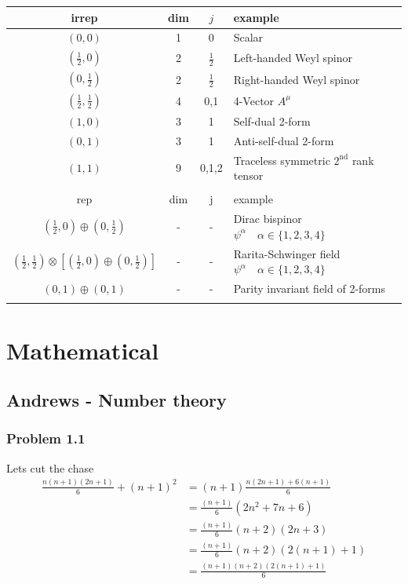 \documentclass[10pt,a4paper]{article}
\theoremstyle{definition}
\begin{document}
\begin{center}
 \begin{tabular}{c c c l} 
 \hline
 irrep & dim & $j$ & example \\ [0.5ex] 
 \hline\hline
 $(0,0)$                        & 1 & 0 & Scalar \\  [0.5ex]
 $(\frac{1}{2},0)$              & 2 & $\frac{1}{2}$ & Left-handed Weyl spinor \\  [0.5ex]
 $(0,\frac{1}{2})$              & 2 & $\frac{1}{2}$ & Right-handed Weyl spinor \\  [0.5ex]
 $(\frac{1}{2},\frac{1}{2})$    & 4 & 0,1 & 4-Vector $A^\mu$ \\  [0.5ex]
 $(1,0)$                        & 3 & 1 & Self-dual 2-form \\  [0.5ex]
 $(0,1)$                        & 3 & 1 & Anti-self-dual 2-form \\  [0.5ex]
 $(1,1)$                        & 9 & 0,1,2 & Traceless symmetric $2^\text{nd}$ rank tensor \\ \hline  \\ [0.5ex]
  \hline
 rep & dim & j & example \\ [0.5ex] 
 \hline\hline
 $(\frac{1}{2},0)\oplus(0,\frac{1}{2})$& - & - & Dirac bispinor $\psi^\alpha\quad \alpha\in\{1,2,3,4\}$ \\  [0.5ex]
 $(\frac{1}{2},\frac{1}{2})\otimes\left[(\frac{1}{2},0)\oplus(0,\frac{1}{2})\right]$& - & - & Rarita-Schwinger field $\psi^\alpha\quad \alpha\in\{1,2,3,4\}$ \\  [0.5ex]
  $(0,1)\oplus(0,1)$& - & - & Parity invariant field of 2-forms\\ \hline \\ [0.5ex]
\end{tabular}
\end{center}



\newpage
\section{Mathematical}

\subsection{{\sc Andrews} - Number theory}
\subsubsection{Problem 1.1}
Lets cut the chase
\begin{align}
\frac{n(n+1)(2n+1)}{6}+(n+1)^2
&=(n+1)\frac{n(2n+1)+6(n+1)}{6}\\
&=\frac{(n+1)}{6}(2n^2+7n+6)\\
&=\frac{(n+1)}{6}(n+2)(2n+3)\\
&=\frac{(n+1)}{6}(n+2)(2(n+1)+1)\\
&=\frac{(n+1)(n+2)(2(n+1)+1)}{6}\\
\end{align}
\end{document}
